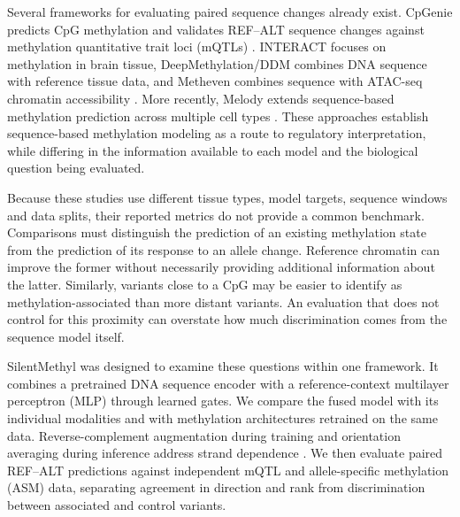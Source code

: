 \documentclass[11pt,letterpaper,twocolumn]{article}
\begin{document}
Several frameworks for evaluating paired sequence changes already exist. CpGenie predicts CpG methylation and validates REF--ALT sequence changes against methylation quantitative trait loci (mQTLs) \cite{zeng2017cpgenie}. INTERACT focuses on methylation in brain tissue, DeepMethylation/DDM combines DNA sequence with reference tissue data, and Metheven combines sequence with ATAC-seq chromatin accessibility \cite{zhou2022interact,li2026deepmethylation,liu2025methven}. More recently, Melody extends sequence-based methylation prediction across multiple cell types \cite{jin2026melody}. These approaches establish sequence-based methylation modeling as a route to regulatory interpretation, while differing in the information available to each model and the biological question being evaluated.

Because these studies use different tissue types, model targets, sequence windows and data splits, their reported metrics do not provide a common benchmark. Comparisons must distinguish the prediction of an existing methylation state from the prediction of its response to an allele change. Reference chromatin can improve the former without necessarily providing additional information about the latter. Similarly, variants close to a CpG may be easier to identify as methylation-associated than more distant variants. An evaluation that does not control for this proximity can overstate how much discrimination comes from the sequence model itself.

SilentMethyl was designed to examine these questions within one framework. It combines a pretrained DNA sequence encoder with a reference-context multilayer perceptron (MLP) through learned gates. We compare the fused model with its individual modalities and with methylation architectures retrained on the same data. Reverse-complement augmentation during training and orientation averaging during inference address strand dependence \cite{mallet2021rc}. We then evaluate paired REF--ALT predictions against independent mQTL and allele-specific methylation (ASM) data, separating agreement in direction and rank from discrimination between associated and control variants.
\end{document}
